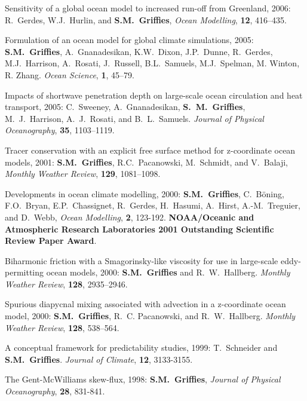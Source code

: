 \begin{etaremune}
\item Sensitivity of a global ocean model to increased run-off from
Greenland, 2006: R.\ Gerdes, W.J.\ Hurlin, and {\bf S.M.\ Griffies},
{\em Ocean Modelling}, {\bf 12}, 416--435.
  
\item Formulation of an ocean model for global climate simulations,
2005: {\bf S.M.\ Griffies}, A.\ Gnanadesikan, K.W.\ Dixon, J.P.\
Dunne, R.\ Gerdes, M.J.\ Harrison, A.\ Rosati, J.\ Russell, B.L.\
Samuels, M.J.\ Spelman, M. Winton, R. Zhang. {\em Ocean Science}, {\bf
1}, 45--79.

\item Impacts of shortwave penetration depth on large-scale ocean
circulation and heat transport, 2005: C.\ Sweeney, A.\ Gnanadesikan,
{\bf S.\ M.\ Grif\/f\/ies}, M.\ J.\ Harrison, A.\ J.\ Rosati, and B.\
L.\ Samuels.  {\em Journal of Physical Oceanography}, {\bf 35},
1103--1119.

\item Tracer conservation with an explicit free surface method for
  z-coordinate ocean models, 2001: {\bf S.M.\ Grif\/f\/ies}, R.C.\
  Pacanowski, M.\ Schmidt, and V.\ Balaji, {\em Monthly Weather
    Review}, {\bf 129}, 1081--1098.

\item Developments in ocean climate modelling, 2000: {\bf S.M.\
    Grif\/f\/ies}, C.\ B\"oning, F.O.\ Bryan, E.P.\ Chassignet, R.\
  Gerdes, H.\ Hasumi, A.\ Hirst, A.-M.\ Treguier, and D.\ Webb, {\em
    Ocean Modelling}, {\bf 2}, 123-192.  {\bf 
    NOAA/Oceanic and Atmospheric Research Laboratories 2001
    Outstanding Scientific Review Paper Award}.

\item Biharmonic friction with a  Smagorinsky-like viscosity for use in large-scale eddy-permitting ocean models, 2000:
{\bf S.M.\ Grif\/f\/ies} and R.\ W.\ Hallberg.  {\em Monthly Weather
Review}, {\bf 128}, 2935--2946.

\item Spurious diapycnal mixing associated with advection in a
z-coordinate ocean model, 2000: {\bf S.M.\ Grif\/f\/ies}, R.\ C.
Pacanowski, and R.\ W.\ Hallberg. {\em Monthly Weather Review}, {\bf
128}, 538--564.

\item A conceptual framework for predictability studies, 1999: T.\ 
Schneider and {\bf S.M.\ Grif\/f\/ies}.  {\em Journal of Climate},
{\bf 12}, 3133-3155.
  
\item The Gent-McWilliams skew-flux, 1998: {\bf S.M.\ 
Grif\/f\/ies}, {\em Journal of Physical Oceanography}, {\bf 28}, 831-841.
  

\end{etaremune}
